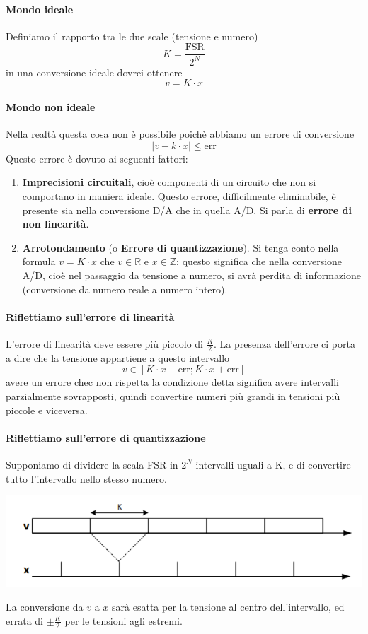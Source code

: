 \documentclass[11pt]{report}
\begin{document}
\paragraph{Mondo ideale} Definiamo il rapporto tra le due scale (tensione e numero)
\[K=\frac{\text{FSR}}{2^N}\]
in una conversione ideale dovrei ottenere 
\[v=K\cdot x\]
\paragraph{Mondo non ideale} Nella realtà questa cosa non è possibile poichè abbiamo un errore di conversione
\[|v-k \cdot x| \leq \text{err}\]
Questo errore è dovuto ai seguenti fattori:
\begin{enumerate}
\item \textbf{Imprecisioni circuitali}, cioè componenti di un circuito che non si comportano in maniera ideale. Questo errore, difficilmente eliminabile, è presente sia nella conversione D/A che in quella A/D. Si parla di \textbf{errore di non linearità}.
\item \textbf{Arrotondamento} (o \textbf{Errore di quantizzazione}). Si tenga conto nella formula $v=K\cdot x$ che $v \in \mathbb{R}$ e $x \in \mathbb{Z}$: questo significa che nella conversione A/D, cioè nel passaggio da tensione a numero, si avrà perdita di informazione (conversione da numero reale a numero intero).  
\end{enumerate}
\paragraph{Riflettiamo sull'errore di linearità} L'errore di linearità deve essere più piccolo di $\frac{K}{2}$. La presenza dell'errore ci porta a dire che la tensione appartiene a questo intervallo
\[v \in [K \cdot x - \text{err}; K \cdot x + \text{err}]\]
avere un errore chec non rispetta la condizione detta significa avere intervalli parzialmente sovrapposti, quindi convertire numeri più grandi in tensioni più piccole e viceversa.
\paragraph{Riflettiamo sull'errore di quantizzazione} Supponiamo di dividere la scala FSR in $2^N$ intervalli uguali a K, e di convertire tutto l'intervallo nello stesso numero.
\begin{center}
\includegraphics{img/232.PNG}
\end{center}
La conversione da $v$ a $x$ sarà esatta per la tensione al centro dell'intervallo, ed errata di $\pm \frac{K}{2}$ per le tensioni agli estremi.
\end{document}
